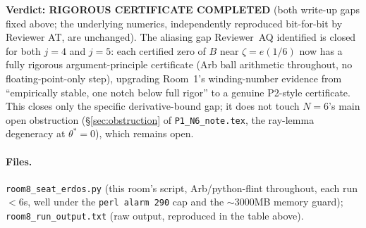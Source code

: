 \textbf{Verdict: RIGOROUS CERTIFICATE COMPLETED} (both write-up gaps fixed above; the underlying
numerics, independently reproduced bit-for-bit by Reviewer AT, are unchanged). The aliasing gap
Reviewer~AQ identified is closed for
both $j=4$ and $j=5$: each certified zero of $B$ near $\zeta=e(1/6)$ now has a fully rigorous
argument-principle certificate (Arb ball arithmetic throughout, no floating-point-only step), upgrading
Room~1's winding-number evidence from ``empirically stable, one notch below full rigor'' to a genuine
P2-style certificate. This closes only the specific derivative-bound gap; it does not touch $N=6$'s main
open obstruction (\S\ref{sec:obstruction} of \texttt{P1\_N6\_note.tex}, the ray-lemma degeneracy at
$\theta^\ast=0$), which remains open.

\paragraph{Files.} \texttt{room8\_seat\_erdos.py} (this room's script, Arb/python-flint throughout,
each run $<6$s, well under the \texttt{perl alarm 290} cap and the $\sim$3000MB memory guard);
\texttt{room8\_run\_output.txt} (raw output, reproduced in the table above).
